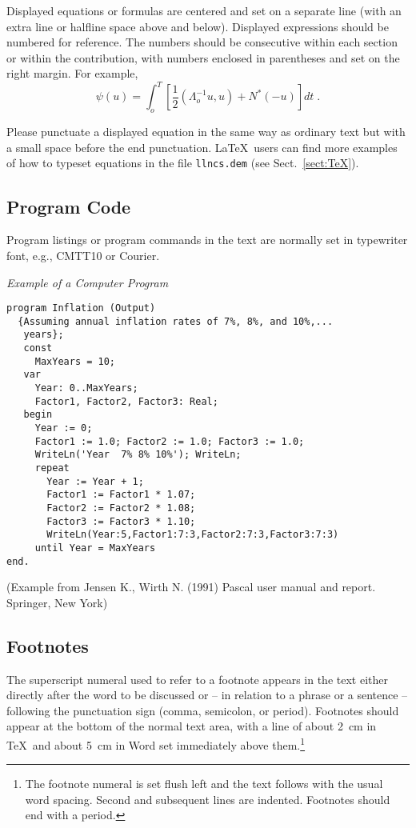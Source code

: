 \documentclass[a4paper]{llncs}
\begin{document}
Displayed equations or formulas are centered and set on a separate
line (with an extra line or halfline space above and below). Displayed
expressions should be numbered for reference. The numbers should be
consecutive within each section or within the contribution,
with numbers enclosed in parentheses and set on the right margin.
For example,
\begin{equation}
  \psi (u) = \int_{o}^{T} \left[\frac{1}{2}
  \left(\Lambda_{o}^{-1} u,u\right) + N^{\ast} (-u)\right] dt \;  .
\end{equation}

Please punctuate a displayed equation in the same way as ordinary
text but with a small space before the end punctuation.
\LaTeX\ users can find more examples of how to typeset equations in the
file \verb+llncs.dem+ (see Sect.~\ref{sect:TeX}).


\subsection{Program Code}

Program listings or program commands in the text are normally set in
typewriter font, e.g., CMTT10 or Courier.

\medskip

\noindent
{\it Example of a Computer Program}
\begin{verbatim}
program Inflation (Output)
  {Assuming annual inflation rates of 7%, 8%, and 10%,...
   years};
   const
     MaxYears = 10;
   var
     Year: 0..MaxYears;
     Factor1, Factor2, Factor3: Real;
   begin
     Year := 0;
     Factor1 := 1.0; Factor2 := 1.0; Factor3 := 1.0;
     WriteLn('Year  7% 8% 10%'); WriteLn;
     repeat
       Year := Year + 1;
       Factor1 := Factor1 * 1.07;
       Factor2 := Factor2 * 1.08;
       Factor3 := Factor3 * 1.10;
       WriteLn(Year:5,Factor1:7:3,Factor2:7:3,Factor3:7:3)
     until Year = MaxYears
end.
\end{verbatim}
%
\noindent
{\small (Example from Jensen K., Wirth N. (1991) Pascal user manual and
report. Springer, New York)}


\subsection{Footnotes}

The superscript numeral used to refer to a footnote appears in the text
either directly after the word to be discussed or -- in relation to a
phrase or a sentence -- following the punctuation sign (comma,
semicolon, or period). Footnotes should appear at the bottom of
the
normal text area, with a line of about 2~cm in \TeX\ and about 5~cm in
Word set
immediately above them.\footnote{The footnote numeral is set flush left
and the text follows with the usual word spacing. Second and subsequent
lines are indented. Footnotes should end with a period.}
\end{document}
